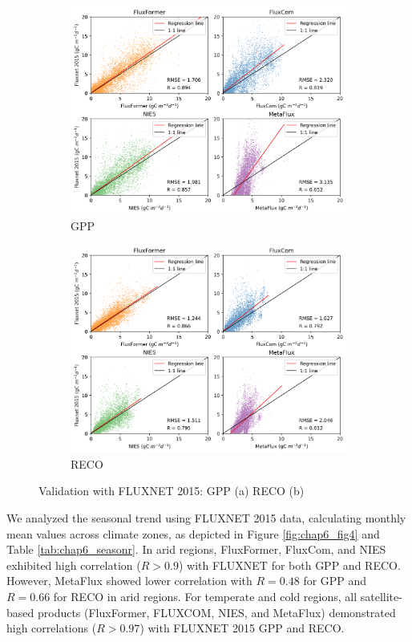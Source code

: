 \begin{figure}[p]
    \centering
    \begin{subfigure}{\textwidth}
      \centering
      \includegraphics[width=.8\textwidth]{figs/chap6/val_fluxnet_all_GPP.png}
      \caption{GPP}
      \label{fig:chap6_fig3a}
    \end{subfigure}

    \begin{subfigure}{\textwidth}
      \centering
      \includegraphics[width=.8\textwidth]{figs/chap6/val_fluxnet_all_RECO.png}
      \caption{RECO}
      \label{fig:chap6_fig3b}
    \end{subfigure}
    \caption[Validation with FLUXNET 2015]{Validation with FLUXNET 2015: GPP (a) RECO (b)}
    \label{fig:chap6_fig3}
\end{figure}
We analyzed the seasonal trend using FLUXNET 2015 data, calculating monthly mean values across climate zones, as depicted in Figure \ref{fig:chap6_fig4} and Table \ref{tab:chap6_seasonr}. In arid regions, FluxFormer, FluxCom, and NIES exhibited high correlation ($R > 0.9$) with FLUXNET for both GPP and RECO. However, MetaFlux showed lower correlation with $R=0.48$ for GPP and $R=0.66$ for RECO in arid regions. For temperate and cold regions, all satellite-based products (FluxFormer, FLUXCOM, NIES, and MetaFlux) demonstrated high correlations ($R>0.97$) with FLUXNET 2015 GPP and RECO. \par

